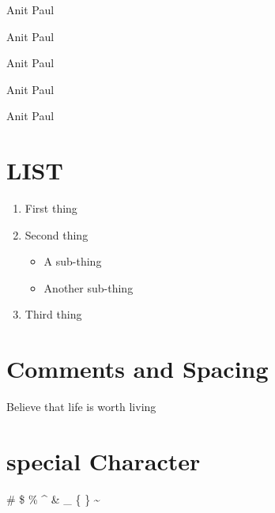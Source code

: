 \documentclass[a4paper,12pt]{report}
\begin{document}
{\small Anit Paul}

{\normalsize Anit Paul}

{\large Anit Paul}

{\LARGE Anit Paul}

{\huge Anit Paul}

\section{LIST}

\begin{enumerate}
\item First thing
\item Second thing
\begin{itemize}
\item A sub-thing
\item Another sub-thing
\end{itemize}
\item Third thing
\end{enumerate}
\section{Comments and Spacing}
Believe that life is worth living%

\section{special Character}
\# \$ \% \^{} \& \_ \{ \} \~{}
\end{document}
